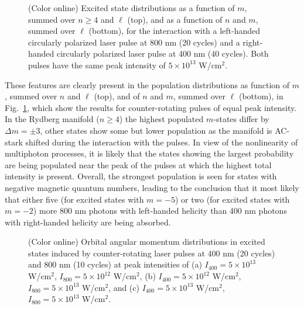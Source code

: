 \begin{figure}[!ht]
\caption{\label{fig:nm-counter-distribution}
(Color online) 
Excited state distributions as a function of $m$, summed over $n \ge 4$ and $\ell$ (top), and as a function of $n$ and $m$, summed over $\ell$ (bottom), for the interaction with a left-handed circularly polarized laser pulse at 800 nm (20 cycles) and a right-handed circularly polarized laser pulse at 400 nm (40 cycles). Both pulses have the same peak intensity of $5 \times 10^{13}$ W/cm$^2$.
}
\end{figure}

These features are clearly present in the population distributions as function of $m$, summed over $n$ and $\ell$ (top), and of $n$ and $m$, summed over $\ell$ (bottom), in Fig.\ \ref{fig:nm-counter-distribution}, which show the results for counter-rotating pulses of equal peak intensity. In the Rydberg manifold ($n \ge 4$) the highest populated $m$-states differ by $\Delta m = \pm 3$, other states show some but lower population as the manifold is AC-stark shifted during the interaction with the pulses. In view of the nonlinearity of multiphoton processes, it is likely that the states showing the largest probability are being populated near the peak of the pulses at which the highest total intensity is present. Overall, the strongest population is seen for states with negative magnetic quantum numbers, leading to the conclusion that it most likely that either five (for excited states with $m = -5$) or two (for excited states with $m = -2$) more 800 nm photons with left-handed helicity than 400 nm photons with right-handed helicity are being absorbed.    


\begin{figure}[!ht]
\centering
\caption{\label{fig:angular}
(Color online) 
Orbital angular momentum distributions in excited states induced by counter-rotating laser pulses at 400 nm (20 cycles) and 800 nm (10 cycles) at peak intensities of (a) $I_{400} =  5 \times 10^{13}$ W/cm$^2$, $I_{800} = 5 \times 10^{12}$ W/cm$^2$, (b) $I_{400} = 5 \times 10^{12}$ W/cm$^2$, $I_{800} =  5 \times 10^{13}$ W/cm$^2$, and (c) $I_{400} = 5 \times 10^{13}$ W/cm$^2$, $I_{800} = 5 \times 10^{13}$ W/cm$^2$.
}
\end{figure}

